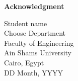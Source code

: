 \cleardoublepage
\newpage
\thispagestyle{empty}
{}

\begin{center}\huge \textbf{Acknowledgment}\end{center}



\vfill
\begin{flushright}
\large
Student name\\
Choose Department\\
Faculty of Engineering\\
Ain Shams University\\
Cairo, Egypt\\
DD Month, YYYY
\end{flushright}





